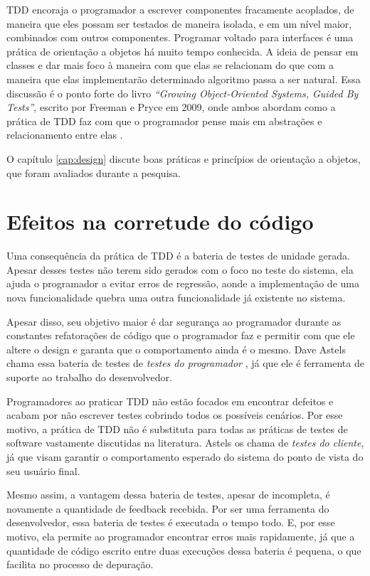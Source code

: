 TDD encoraja o programador a escrever componentes fracamente acoplados, de
maneira que eles possam ser testados de maneira isolada, e em um nível maior,
combinados com outros componentes.
Programar voltado para interfaces é uma prática de orientação a objetos há muito
tempo conhecida. A ideia de pensar em classes e dar mais foco à maneira com que
elas se relacionam do que com a maneira que elas implementarão determinado
algoritmo passa a ser natural. Essa discussão é o ponto forte do livro
\textit{``Growing Object-Oriented Systems, Guided By Tests''}, escrito por
Freeman e Pryce em 2009, onde ambos abordam como a prática de TDD faz com que
o programador pense mais em abstrações e relacionamento entre elas \cite{GOOS}.

O capítulo \ref{cap:design} discute boas práticas e princípios de orientação a
objetos, que foram avaliados durante a pesquisa.

\section{Efeitos na corretude do código}

Uma consequência da prática de TDD é a bateria de testes de unidade gerada.
Apesar desses testes não terem sido gerados com o foco no teste do sistema, 
ela ajuda o programador a evitar erros de regressão, aonde a implementação de
uma nova funcionalidade quebra uma outra funcionalidade já existente no sistema.

Apesar disso, seu objetivo maior é dar segurança ao programador durante as
constantes refatorações de código que o programador faz e permitir com que ele
altere o design e garanta que o comportamento ainda é o mesmo. Dave Astels chama
essa bateria de testes de \textit{testes do programador} \cite{astels-tdd}, já
que ele é ferramenta de suporte ao trabalho do desenvolvedor.

Programadores ao praticar TDD não estão focados em encontrar defeitos e
acabam por não escrever testes cobrindo todos os possíveis cenários. Por esse
motivo, a prática de TDD não é substituta para todas as práticas de testes de
software vastamente discutidas na literatura. Astels os chama de \textit{testes do
cliente}, já que visam garantir o comportamento esperado do sistema do ponto de
vista do seu usuário final.

Mesmo assim, a vantagem dessa bateria de testes, apesar de incompleta, é
novamente a quantidade de feedback recebida. Por ser uma ferramenta do
desenvolvedor, essa bateria de testes é executada o tempo todo. E, por esse
motivo, ela permite ao programador encontrar erros mais rapidamente, já que a
quantidade de código escrito entre duas execuções dessa bateria é pequena, o que
facilita no processo de depuração.


